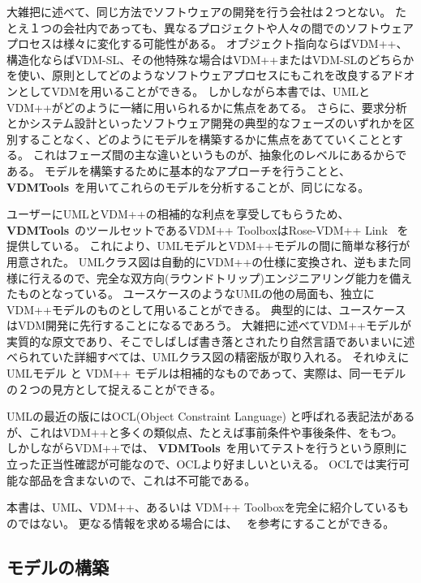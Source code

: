 \documentclass[\pformat,12pt,twoside]{jarticle}
\newcommand{\vdmtools}{\textbf{VDMTools}}
\begin{document}
大雑把に述べて、同じ方法でソフトウェアの開発を行う会社は２つとない。
たとえ１つの会社内であっても、異なるプロジェクトや人々の間でのソフトウェアプロセスは様々に変化する可能性がある。
オブジェクト指向ならばVDM++、構造化ならばVDM-SL、その他特殊な場合はVDM++またはVDM-SLのどちらかを使い、原則としてどのようなソフトウェアプロセスにもこれを改良するアドオンとしてVDMを用いることができる。
しかしながら本書では、UMLとVDM++がどのように一緒に用いられるかに焦点をあてる。
さらに、要求分析とかシステム設計といったソフトウェア開発の典型的なフェーズのいずれかを区別することなく、どのようにモデルを構築するかに焦点をあてていくこととする。
これはフェーズ間の主な違いというものが、抽象化のレベルにあるからである。
モデルを構築するために基本的なアプローチを行うことと、 \vdmtools\ を用いてこれらのモデルを分析することが、同じになる。

ユーザーにUMLとVDM++の相補的な利点を享受してもらうため、\vdmtools\ のツールセットであるVDM++ ToolboxはRose-VDM++ Link \cite{UMLMan-CSK}\ を提供している。
これにより、UMLモデルとVDM++モデルの間に簡単な移行が用意された。
UMLクラス図は自動的にVDM++の仕様に変換され、逆もまた同様に行えるので、完全な双方向(ラウンドトリップ)エンジニアリング能力を備えたものとなっている。
ユースケースのようなUMLの他の局面も、独立にVDM++モデルのものとして用いることができる。
典型的には、ユースケースはVDM開発に先行することになるであろう。
大雑把に述べてVDM++モデルが実質的な原文であり、そこでしばしば書き落とされたり自然言語であいまいに述べられていた詳細すべては、UMLクラス図の精密版が取り入れる。
それゆえにUMLモデル と VDM++ モデルは相補的なものであって、実際は、同一モデルの２つの見方として捉えることができる。

UMLの最近の版にはOCL(Object Constraint Language) と呼ばれる表記法があるが、これはVDM++と多くの類似点、たとえば事前条件や事後条件、をもつ。
しかしながらVDM++では、 \vdmtools\ を用いてテストを行うという原則に立った正当性確認が可能なので、OCLより好ましいといえる。
OCLでは実行可能な部品を含まないので、これは不可能である。 

本書は、UML、VDM++、あるいは VDM++ Toolboxを完全に紹介しているものではない。
更なる情報を求める場合には、 \cite{Booch&99,LangManPP-CSK,UserManPP-CSK}\ を参考にすることができる。

\subsection{モデルの構築}
\end{document}
